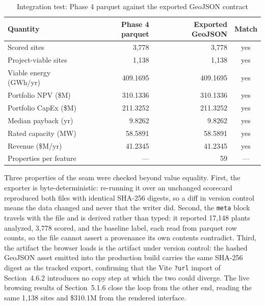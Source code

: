 \documentclass[12pt,letterpaper]{report}
\begin{document}
\begin{table}[htbp]
\centering
\caption{Integration test: Phase 4 parquet against the exported GeoJSON contract}
\label{tab:integration}
\small
\begin{tabular}{@{}lrrc@{}}
\toprule
Quantity & Phase 4 parquet & Exported GeoJSON & Match \\
\midrule
Scored sites            & 3{,}778      & 3{,}778      & yes \\
Project-viable sites    & 1{,}138      & 1{,}138      & yes \\
Viable energy (GWh/yr)  & 409.1695     & 409.1695     & yes \\
Portfolio NPV (\$M)     & 310.1336     & 310.1336     & yes \\
Portfolio CapEx (\$M)   & 211.3252     & 211.3252     & yes \\
Median payback (yr)     & 9.8262       & 9.8262       & yes \\
Rated capacity (MW)     & 58.5891      & 58.5891      & yes \\
Revenue (\$M/yr)        & 41.2345      & 41.2345      & yes \\
Properties per feature  & ---          & 59           & --- \\
\bottomrule
\end{tabular}
\end{table}

Three properties of the seam were checked beyond value equality. First, the exporter
is byte-deterministic: re-running it over an unchanged scorecard reproduced both files
with identical SHA-256 digests, so a diff in version control means the data changed
and never that the writer did. Second, the \texttt{meta} block travels with the file
and is derived rather than typed: it reported 17{,}148 plants analyzed, 3{,}778
scored, and the baseline label, each read from parquet row counts, so the file cannot
assert a provenance its own contents contradict. Third, the artifact the browser
loads is the artifact under version control: the hashed GeoJSON asset emitted into the
production build carries the same SHA-256 digest as the tracked export, confirming
that the Vite \texttt{?url} import of Section~4.6.2 introduces no copy step at which
the two could diverge. The live browsing results of Section~5.1.6 close the loop from
the other end, reading the same 1{,}138 sites and \$310.1M from the rendered
interface.
\end{document}
